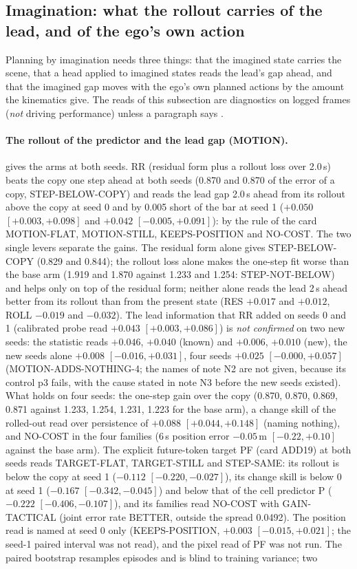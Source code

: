 \subsection{Imagination: what the rollout carries of the lead, and of the ego's own action}\label{sec:imag}
Planning by imagination needs three things: that the imagined state carries the scene, that a head applied to imagined states reads the lead's gap ahead, and that the imagined gap moves with the ego's own planned actions by the amount the kinematics give. The reads of this subsection are  diagnostics on logged frames (\emph{not} driving performance) unless a paragraph says .

\paragraph{The rollout of the predictor and the lead gap (MOTION).}  gives the arms at both seeds. RR (residual form plus a rollout loss over 2.0\,s) beats the copy one step ahead at both seeds (0.870 and 0.870 of the error of a copy, STEP-BELOW-COPY) and reads the lead gap 2.0\,s ahead from its rollout above the copy at seed 0 and by 0.005 short of the bar at seed 1 ($+0.050$ $[+0.003,+0.098]$ and $+0.042$ $[-0.005,+0.091]$): by the rule of the card MOTION-FLAT, MOTION-STILL, KEEPS-POSITION and NO-COST. The two single levers separate the gains. The residual form alone gives STEP-BELOW-COPY (0.829 and 0.844); the rollout loss alone makes the one-step fit worse than the base arm (1.919 and 1.870 against 1.233 and 1.254: STEP-NOT-BELOW) and helps only on top of the residual form; neither alone reads the lead 2\,s ahead better from its rollout than from the present state (RES $+0.017$ and $+0.012$, ROLL $-0.019$ and $-0.032$). The lead information that RR added on seeds 0 and 1 (calibrated probe read $+0.043$ $[+0.003,+0.086]$) is \emph{not confirmed} on two new seeds: the statistic reads $+0.046$, $+0.040$ (known) and $+0.006$, $+0.010$ (new), the new seeds alone $+0.008$ $[-0.016,+0.031]$, four seeds $+0.025$ $[-0.000,+0.057]$ (MOTION-ADDS-NOTHING-4; the names of note N2 are not given, because its control p3 fails, with the cause stated in note N3 before the new seeds existed). What holds on four seeds: the one-step gain over the copy (0.870, 0.870, 0.869, 0.871 against 1.233, 1.254, 1.231, 1.223 for the base arm), a change skill of the rolled-out read over persistence of $+0.088$ $[+0.044,+0.148]$ (naming nothing), and NO-COST in the four families (6\,s position error $-0.05$\,m $[-0.22,+0.10]$ against the base arm). The explicit future-token target PF (card ADD19) at both seeds reads TARGET-FLAT, TARGET-STILL and STEP-SAME: its rollout is below the copy at seed 1 ($-0.112$ $[-0.220,-0.027]$), its change skill is below 0 at seed 1 ($-0.167$ $[-0.342,-0.045]$) and below that of the cell predictor P ($-0.222$ $[-0.406,-0.107]$), and its families read NO-COST with GAIN-TACTICAL (joint error rate BETTER, outside the spread 0.0492). The position read is named at seed 0 only (KEEPS-POSITION, $+0.003$ $[-0.015,+0.021]$; the seed-1 paired interval was not read), and the pixel read of PF was not run. The paired bootstrap resamples episodes and is blind to training variance; two 